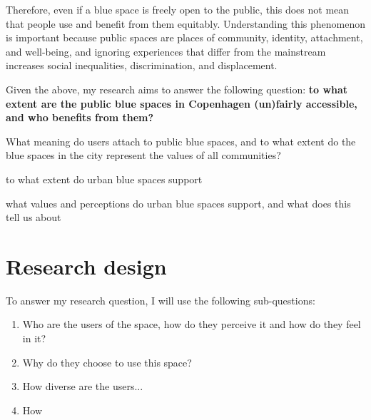 \documentclass{article}
\begin{document}

Therefore, even if a blue space is freely open to the public, this does not mean that people use and benefit from them equitably. Understanding this phenomenon is important because public spaces are places of community, identity, attachment, and well-being, and ignoring experiences that differ from the mainstream increases social inequalities, discrimination, and displacement.

Given the above, my research aims to answer the following question: \textbf{to what extent are the public blue spaces in Copenhagen (un)fairly accessible, and who benefits from them?}

What meaning do users attach to public blue spaces, and to what extent do the blue spaces in the city represent the values of all communities?

to what extent do urban blue spaces support 

what values and perceptions do urban blue spaces support, and what does this tell us about



\section{Research design}

To answer my research question, I will use the following sub-questions:

\begin{enumerate}
	\item Who are the users of the space, how do they perceive it and how do they feel in it?
	\item Why do they choose to use this space?
	\item How diverse are the users... 
	\item How 
\end{enumerate}
\end{document}
